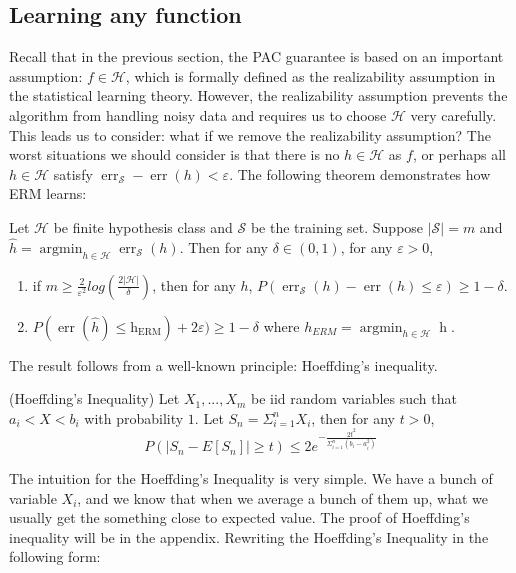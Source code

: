 \subsection{Learning any function}
Recall that in the previous section, the PAC guarantee is based on an important assumption: $f \in \mathcal{H}$, which is formally defined as the realizability assumption in the statistical learning theory. However, the realizability assumption prevents the algorithm from handling noisy data and requires us to choose $\mathcal{H}$ very carefully. This leads us to consider: what if we remove the realizability assumption? The worst situations we should consider is that there is no $h \in \mathcal{H}$ as $f$, or perhaps all $h \in \mathcal{H}$ satisfy  $\operatorname{err}_{\mathcal{S}}-\operatorname{err}(h) < \varepsilon$. The following theorem demonstrates how ERM learns:

\begin{theorem}\cite{Awasthi:3}
Let $\mathcal{H}$ be finite hypothesis class and $\mathcal{S}$ be the training set. Suppose $|\mathcal{S}| = m$ and $\hat{h} = \operatorname{argmin}_{h \in \mathcal{H}} \operatorname{err}_{\mathcal{S}}(h)$. Then for any $\delta \in (0,1)$, for any $\varepsilon > 0$,
\begin{enumerate}
    \item if $m \geq \frac{2}{\varepsilon^2}log(\frac{2|\mathcal{H}|}{\delta})$, then for any $h$, $P(\operatorname{err}_{\mathcal{S}}(h)-\operatorname{err}(h) \leq \varepsilon) \geq 1 - \delta$.
    \item $P(\operatorname{err}(\hat{h}) \leq \operatorname{h_{ERM}}) + 2\varepsilon) \geq 1- \delta$ where $h_{ERM} = \operatorname{argmin}_{h\in \mathcal{H}} \operatorname{h}$.
    \end{enumerate}
\end{theorem}

\noindent The result follows from a well-known principle: Hoeffding's inequality. 

\begin{lemma} 
(Hoeffding's Inequality)\cite{Nowak}
Let $X_{1},...,X_{m}$ be iid random variables such that $a_{i}<X<b_{i}$ with probability $1$. Let $S_{n} = \Sigma_{i=1}^{n}X_{i}$, then for any $t>0$,  
\begin{equation*}
    P(|S_{n} - E[S_{n}]|\geq t) \leq 2e^{- \frac{2t^2}{\Sigma_{i=1}^{n}(b_{i}-a_{i}^{2})}}
\end{equation*}
\end{lemma}
The intuition for the Hoeffding's Inequality is very simple. We have a bunch of variable $X_{i}$, and we know that when we average a bunch of them up, what we usually get the something close to expected value. The proof of Hoeffding's inequality will be in the appendix. Rewriting the Hoeffding's Inequality in the following form:

